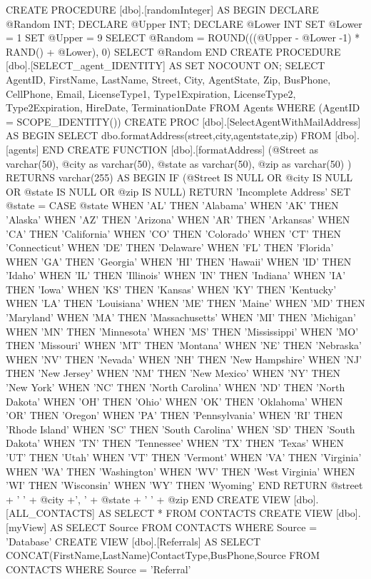 CREATE PROCEDURE [dbo].[randomInteger] AS BEGIN
DECLARE @Random INT;
DECLARE @Upper INT;
DECLARE @Lower INT
SET @Lower = 1 
SET @Upper = 9 
SELECT @Random = ROUND(((@Upper - @Lower -1) * RAND() + @Lower), 0)
SELECT @Random
END
CREATE PROCEDURE [dbo].[SELECT_agent_IDENTITY]
AS
	SET NOCOUNT ON;
SELECT AgentID, FirstName, LastName, Street, City, AgentState, Zip, BusPhone, CellPhone, Email, LicenseType1, Type1Expiration, LicenseType2, Type2Expiration, HireDate, TerminationDate FROM Agents WHERE (AgentID = SCOPE_IDENTITY())
CREATE PROC [dbo].[SelectAgentWithMailAddress]
AS BEGIN
SELECT dbo.formatAddress(street,city,agentstate,zip) FROM [dbo].[agents]
END
CREATE FUNCTION [dbo].[formatAddress]
(@Street as varchar(50),
@city as varchar(50),
@state as varchar(50),
@zip as varchar(50)
)	RETURNS varchar(255) AS BEGIN
	IF (@Street IS NULL OR
	@city IS NULL OR
	@state IS NULL OR
	@zip IS NULL)
	RETURN 'Incomplete Address'
SET @state = 
CASE @state
	WHEN 'AL' THEN 'Alabama'
WHEN 'AK' THEN 'Alaska'	
WHEN 'AZ' THEN 'Arizona'	
WHEN 'AR' THEN 'Arkansas'	
WHEN 'CA' THEN 'California'	
WHEN 'CO' THEN 'Colorado'
WHEN 'CT' THEN 'Connecticut'
WHEN 'DE' THEN 'Delaware'
WHEN 'FL' THEN 'Florida'
WHEN 'GA' THEN 'Georgia'
WHEN 'HI' THEN 'Hawaii'
WHEN 'ID' THEN 'Idaho'
WHEN 'IL' THEN 'Illinois'
WHEN 'IN' THEN 'Indiana'
WHEN 'IA' THEN 'Iowa'
WHEN 'KS' THEN 'Kansas'
WHEN 'KY' THEN 'Kentucky'
WHEN 'LA' THEN 'Louisiana'
WHEN 'ME' THEN 'Maine'
WHEN 'MD' THEN 'Maryland'
WHEN 'MA' THEN 'Massachusetts'
WHEN 'MI' THEN 'Michigan'
WHEN 'MN' THEN 'Minnesota'
WHEN 'MS' THEN 'Mississippi'
WHEN 'MO' THEN 'Missouri'
WHEN 'MT' THEN 'Montana'
WHEN 'NE' THEN 'Nebraska'
WHEN 'NV' THEN 'Nevada'
WHEN 'NH' THEN 'New Hampshire'
WHEN 'NJ' THEN 'New Jersey'
WHEN 'NM' THEN 'New Mexico'
WHEN 'NY' THEN 'New York'
WHEN 'NC' THEN 'North Carolina'
WHEN 'ND' THEN 'North Dakota'
WHEN 'OH' THEN 'Ohio'
WHEN 'OK' THEN 'Oklahoma'
WHEN 'OR' THEN 'Oregon'
WHEN 'PA' THEN 'Pennsylvania'
WHEN 'RI' THEN 'Rhode Island'
WHEN 'SC' THEN 'South Carolina'
WHEN 'SD' THEN 'South Dakota'
WHEN 'TN' THEN 'Tennessee'
WHEN 'TX' THEN 'Texas'
WHEN 'UT' THEN 'Utah'
WHEN 'VT' THEN 'Vermont'
WHEN 'VA' THEN 'Virginia'
WHEN 'WA' THEN 'Washington'
WHEN 'WV' THEN 'West Virginia'
WHEN 'WI' THEN 'Wisconsin'
WHEN 'WY' THEN 'Wyoming'
END
RETURN @street + ' ' + @city +', ' + @state + ' ' + @zip
END
CREATE VIEW [dbo].[ALL_CONTACTS]
AS
SELECT * FROM CONTACTS
CREATE VIEW [dbo].[myView]
AS
SELECT Source
FROM CONTACTS
WHERE Source = 'Database'
CREATE VIEW [dbo].[Referrals]
AS
SELECT CONCAT(FirstName,LastName)ContactType,BusPhone,Source
FROM CONTACTS
WHERE Source = 'Referral'